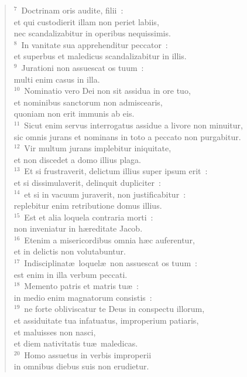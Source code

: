\begin{flushleft}\begin{verse}${}^{7}$~Doctrinam oris audite, filii~:\\ et qui custodierit illam non periet labiis,\\ nec scandalizabitur in operibus nequissimis.\\
${}^{8}$~In vanitate sua apprehenditur peccator~:\\ et superbus et maledicus scandalizabitur in illis.\\
${}^{9}$~Jurationi non assuescat os tuum~:\\ multi enim casus in illa.\\
${}^{10}$~Nominatio vero Dei non sit assidua in ore tuo,\\ et nominibus sanctorum non admiscearis,\\ quoniam non erit immunis ab eis.\\
${}^{11}$~Sicut enim servus interrogatus assidue a livore non minuitur,\\ sic omnis jurans et nominans in toto a peccato non purgabitur.\\
${}^{12}$~Vir multum jurans implebitur iniquitate,\\ et non discedet a domo illius plaga.\\
${}^{13}$~Et si frustraverit, delictum illius super ipsum erit~:\\ et si dissimulaverit, delinquit dupliciter~:\\
${}^{14}$~et si in vacuum juraverit, non justificabitur~:\\ replebitur enim retributione domus illius.\\
${}^{15}$~Est et alia loquela contraria morti~:\\ non inveniatur in h\ae reditate Jacob.\\
${}^{16}$~Etenim a misericordibus omnia h\ae c auferentur,\\ et in delictis non volutabuntur.\\
${}^{17}$~Indisciplinat\ae\ loquel\ae\ non assuescat os tuum~:\\ est enim in illa verbum peccati.\\
${}^{18}$~Memento patris et matris tu\ae~:\\ in medio enim magnatorum consistis~:\\
${}^{19}$~ne forte obliviscatur te Deus in conspectu illorum,\\ et assiduitate tua infatuatus, improperium patiaris,\\ et maluisses non nasci,\\ et diem nativitatis tu\ae\ maledicas.\\
${}^{20}$~Homo assuetus in verbis improperii\\ in omnibus diebus suis non erudietur.\end{verse}\end{flushleft}


